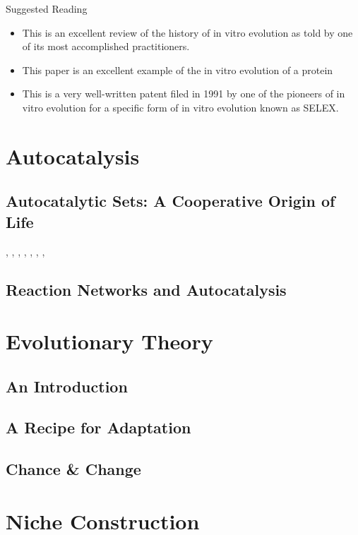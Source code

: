 \documentclass[]{article}
\begin{document}
Suggested Reading
\begin{itemize}
	\item \cite{joyce2007forty}This is an excellent review of the history of in vitro evolution as told by one of its most accomplished practitioners.
	\item \cite{seelig2007selection} This paper is an excellent example of the in vitro evolution of a protein
	\item \cite{chen2007ribozyme} This is a very well-written patent filed in 1991 by one of the pioneers of in
	vitro evolution for a specific form of in vitro evolution known as SELEX.
\end{itemize}


\section{Autocatalysis}

\subsection{Autocatalytic Sets: A Cooperative Origin of Life}
\cite{wim2017origin}, \cite{hordijk2017chasing}, \cite{wim2019wandering}, \cite{patzke2007self}, \cite{vaidya2012spontaneous}, \cite{ashkenasy2004design}, \cite{hordijk2012structure}, \cite{sousa2015autocatalytic}

\subsection{Reaction Networks and Autocatalysis}

\section{Evolutionary Theory}

\subsection{An Introduction}

\subsection{A Recipe for Adaptation}

\subsection{Chance \& Change}

\section{Niche Construction}


\printglossaries

 


\end{document}
